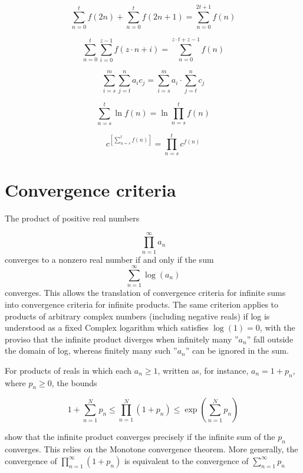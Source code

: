 \[\sum_{n=0}^t f(2n) + \sum_{n=0}^t f(2n+1) = \sum_{n=0}^{2t+1} f(n)\] 

\[\sum_{n=0}^t \sum_{i=0}^{z-1} f(z\cdot n+i) = \sum_{n=0}^{z\cdot t+z-1} f(n)\] 

\[\sum_{i=s}^m\sum_{j=t}^n {a_i}{c_j} = \sum_{i=s}^m a_i \cdot \sum_{j=t}^n c_j\] 

\[\sum_{n=s}^t \ln f(n) = \ln \prod_{n=s}^t f(n)\] 

\[c^{\left[\sum_{n=s}^t f(n) \right]} = \prod_{n=s}^t c^{f(n)}\] 
 
 
 \section{Convergence criteria}
 
The product of positive real numbers

\[\prod_{n=1}^{\infty} a_n\]
converges to a nonzero real number if and only if the sum
\[\sum_{n=1}^{\infty} \log(a_n)\]
converges. This allows the translation of convergence criteria for infinite sums into convergence criteria for infinite products. The same criterion applies to products of arbitrary complex numbers (including negative reals) if log is understood as a fixed Complex logarithm which satisfies $\log(1) = 0$, with the proviso that the infinite product diverges when infinitely many ''$a_n$'' fall outside 
the domain of log, whereas finitely many such ''$a_n$'' can be ignored in the sum.

For products of reals in which each $a_n\ge1$, written as, for instance, $a_n=1+p_n$,
where $p_n\ge 0$, the bounds

\[1+\sum_{n=1}^{N} p_n \le \prod_{n=1}^{N} \left( 1 + p_n \right) \le \exp \left( \sum_{n=1}^{N}p_n \right)\]

show that the infinite product converges precisely if the infinite sum of the $p_n$ converges. This relies on the Monotone convergence theorem. More generally, the convergence of $\prod_{n=1}^\infty(1+p_n)$ is equivalent to the convergence of $\sum_{n=1}^\infty p_n$ 
%
% 
 
 
 
 
 
 
 
 